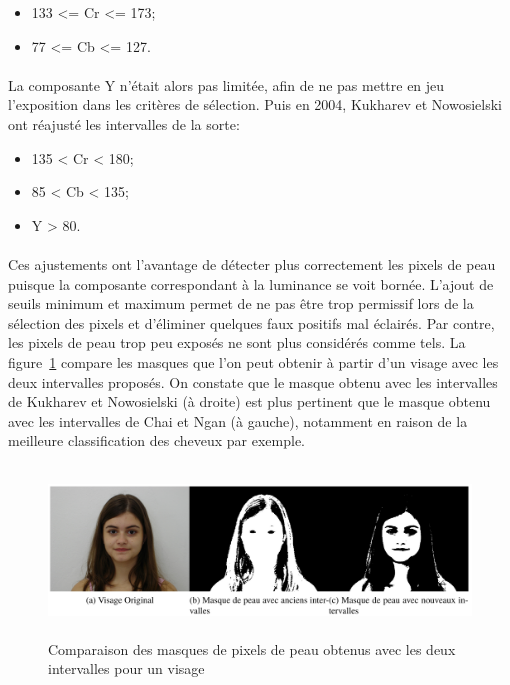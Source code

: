 \documentclass[11pt, french]{report-rd-info}
\begin{document}
\begin{itemize}
\item 133 <= Cr <= 173;
\item 77 <= Cb <= 127.
\end{itemize}

\paragraph*{}
La composante Y n'était alors pas limitée, afin de ne pas mettre en jeu l'exposition dans les critères de sélection.
Puis en 2004, Kukharev et Nowosielski \cite{Kukharev2004} ont réajusté les intervalles de la sorte:

\begin{itemize}
\item 135 < Cr < 180;
\item 85 < Cb < 135;
\item Y > 80.
\end{itemize}

\paragraph*{}
Ces ajustements ont l'avantage de détecter plus correctement les pixels de peau puisque la composante correspondant à la luminance se voit bornée. L'ajout de seuils minimum et maximum permet de ne pas être trop permissif lors de la sélection des pixels et d'éliminer quelques faux positifs mal éclairés. Par contre, les pixels de peau trop peu exposés ne sont plus considérés comme tels. La figure~\ref{fig:IntervalleMasquePeau1} compare les masques que l'on peut obtenir à partir d'un visage avec les deux intervalles proposés. On constate que le masque obtenu avec les intervalles de Kukharev et Nowosielski \cite{Kukharev2004} (à droite) est plus pertinent que le masque obtenu avec les intervalles de Chai et Ngan \cite{Chai1999} (à gauche), notamment en raison de la meilleure classification des cheveux par exemple.

\begin{figure}
\centering
\includegraphics[height=4.5cm,width=15cm]{Images/ea_compmasque}
\caption{Comparaison des masques de pixels de peau obtenus avec les deux intervalles pour un visage}
 \label{fig:IntervalleMasquePeau1}
\end{figure}
\end{document}
